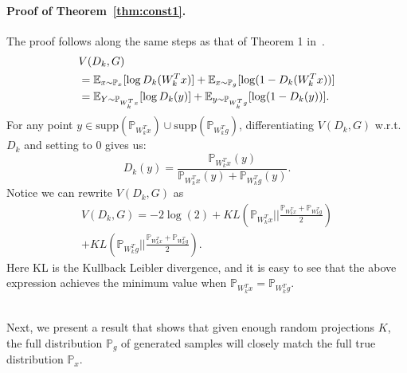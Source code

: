 \documentclass{article}
\newcommand{\supp}{\mbox{supp}}
\newcommand{\px}{\mathbb{P}_{x}}
\newcommand{\pg}{\mathbb{P}_{g}}
\newcommand{\pwix}{\mathbb{P}_{W_k^Tx}}
\newcommand{\pwig}{\mathbb{P}_{W_k^Tg}}
\newcommand{\expec}{\mathbb{E}}
\begin{document}
\paragraph{Proof of Theorem~\ref{thm:const1}.} The proof  follows along the same steps as that of Theorem 1 in~\cite{goodfellow2014generative}.
\begin{align}&V(D_k, G) \notag\\&=\expec_{x \sim \px} [\log D_k(W_k^T x)] + \expec_{x \sim \pg} [\log(1- D_k(W_k^T x) )]\notag\\
&= \expec_{Y \sim \pwix} [\log D_k(y)] + \expec_{y \sim \pwig} [\log(1- D_k(y) )].
\end{align} 
For any point $y \in \supp(\pwix) \cup \supp(\pwig)$, differentiating $V(D_k, G)$ w.r.t.~$D_k$ and setting to $0$ gives us:
\begin{equation}
D_k(y) =  \frac{\pwix(y)}{\pwix(y) + \pwig(y)}.  
\end{equation}
Notice we can rewrite $V(D_k, G)$ as
\begin{multline}
V(D_k,G)=-2\log(2)+KL \left(\pwix|| \frac{\pwix +\pwig}{2}\right)\\+KL \left(\pwig|| \frac{\pwix +\pwig}{2}\right).
\end{multline}
Here KL is the Kullback Leibler divergence, and it is easy to see that the above expression achieves the minimum value when $\pwix =\pwig$.\\~



Next, we present a result that shows that given enough random projections $K$, the full distribution $\pg$ of generated samples will closely match the full true distribution $\px$.
\end{document}
